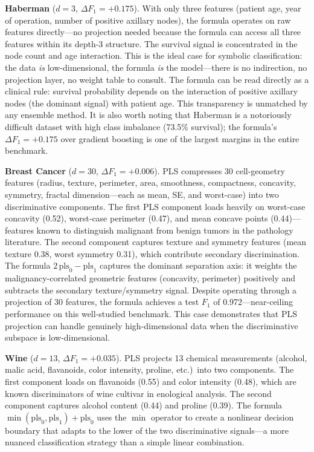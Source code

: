 \documentclass[journal]{IEEEtran}
\begin{document}
\textbf{Haberman} ($d = 3$, $\Delta F_1 = +0.175$).
With only three features (patient age, year of operation, number of
positive axillary nodes), the formula operates on raw features
directly---no projection needed because the formula can access all
three features within its depth-3 structure.  The survival signal
is concentrated in the node count and age interaction.  This is the
ideal case for symbolic classification: the data \emph{is}
low-dimensional, the formula \emph{is} the model---there is no
indirection, no projection layer, no weight table to consult.  The
formula can be read directly as a clinical rule: survival
probability depends on the interaction of positive axillary nodes
(the dominant signal) with patient age.  This transparency is
unmatched by any ensemble method.  It is also worth noting that
Haberman is a notoriously difficult dataset with high class
imbalance (73.5\% survival); the formula's $\Delta F_1 = +0.175$
over gradient boosting is one of the largest margins in the entire
benchmark.

\textbf{Breast Cancer} ($d = 30$, $\Delta F_1 = +0.006$).
PLS compresses 30 cell-geometry features (radius, texture,
perimeter, area, smoothness, compactness, concavity, symmetry,
fractal dimension---each as mean, SE, and worst-case) into two
discriminative components.  The first PLS component loads heavily on
worst-case concavity (0.52), worst-case perimeter (0.47), and mean
concave points (0.44)---features known to distinguish malignant from
benign tumors in the pathology literature.  The second component
captures texture and symmetry features (mean texture 0.38, worst
symmetry 0.31), which contribute secondary discrimination.
The formula $2\,\mathrm{pls}_0 - \mathrm{pls}_1$ captures the
dominant separation axis: it weights the malignancy-correlated
geometric features (concavity, perimeter) positively and subtracts
the secondary texture/symmetry signal.  Despite operating through a
projection of 30 features, the formula achieves a test $F_1$ of
0.972---near-ceiling performance on this well-studied benchmark.
This case demonstrates that PLS projection can handle genuinely
high-dimensional data when the discriminative subspace is
low-dimensional.

\textbf{Wine} ($d = 13$, $\Delta F_1 = +0.035$).
PLS projects 13 chemical measurements (alcohol, malic acid,
flavanoids, color intensity, proline, etc.)\ into two components.
The first component loads on flavanoids (0.55) and color intensity
(0.48), which are known discriminators of wine cultivar in
enological analysis.  The second component captures alcohol content
(0.44) and proline (0.39).  The formula
$\min(\mathrm{pls}_0, \mathrm{pls}_1) + \mathrm{pls}_0$ uses the
$\min$ operator to create a nonlinear decision boundary that adapts
to the lower of the two discriminative signals---a more nuanced
classification strategy than a simple linear combination.
\end{document}
